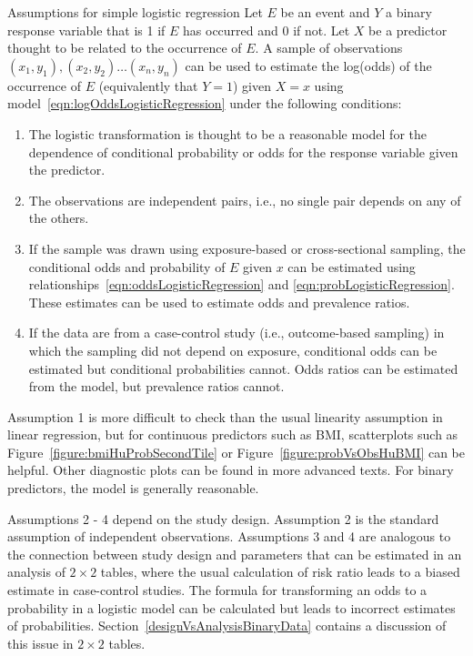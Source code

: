 \begin{onebox}{Assumptions for simple logistic regression} \label{box:logisticRegressionConditions}
  Let $E$ be an event and $Y$ a binary response variable that is 1 if $E$ has occurred and 0 if not. Let $X$ be a predictor thought to be related to the occurrence of $E$. A sample of observations $(x_1, y_1), (x_2, y_2)\ldots(x_n, y_n)$ can be used to estimate the log(odds) of the occurrence of $E$ (equivalently that $Y = 1$)  given $X = x$ using model~\ref{eqn:logOddsLogisticRegression} under the following conditions:

  \begin{enumerate}
      \item The logistic transformation is thought to be a reasonable model for the dependence of conditional probability or odds for the response variable given the predictor.
      \item The observations are independent pairs, i.e., no single pair depends on any of the others.
      \item If the sample was drawn using exposure-based or cross-sectional sampling, the conditional odds and probability of $E$ given $x$ can be estimated using relationships~\ref{eqn:oddsLogisticRegression} and \ref{eqn:probLogisticRegression}.  These estimates can be used to estimate odds and prevalence ratios.
      \item If the data are from a case-control study (i.e., outcome-based sampling) in which the sampling did not depend on exposure, conditional odds can be estimated but conditional probabilities cannot. Odds ratios can be estimated from the model, but prevalence ratios cannot.
  \end{enumerate}
\end{onebox}

Assumption 1 is more difficult to check than the usual linearity assumption in linear regression, but for continuous predictors such as BMI, scatterplots such as Figure~\ref{figure:bmiHuProbSecondTile} or Figure~\ref{figure:probVsObsHuBMI} can be helpful. Other diagnostic plots can be found in more advanced texts. For binary predictors, the model is generally reasonable.

Assumptions 2 - 4 depend on the study design. Assumption 2 is the standard assumption of independent observations.  Assumptions 3 and 4 are analogous to the connection between study design and parameters that can be estimated in an analysis of $2 \times 2$ tables, where the usual calculation of risk ratio leads to a biased estimate in case-control studies.  The formula for transforming an odds to a probability in a logistic model can be calculated but leads to incorrect estimates of probabilities.  Section~\ref{designVsAnalysisBinaryData} contains a discussion of this issue in $2 \times 2$ tables.

